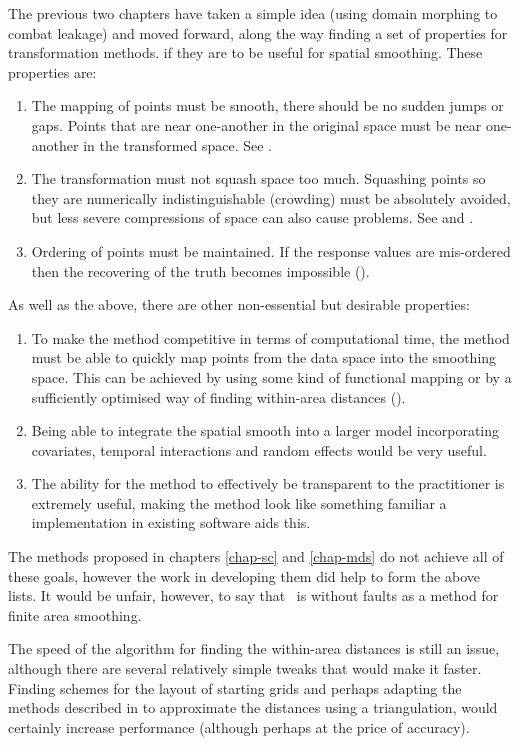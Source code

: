 The previous two chapters have taken a simple idea (using domain morphing to combat leakage) and moved forward, along the way finding a set of properties for transformation methods.
 if they are to be useful for spatial smoothing. These properties are:
\begin{enumerate}
\item The mapping of points must be smooth, there should be no sudden jumps or gaps. Points that are near one-another in the original space must be near one-another in the transformed space. See .
\item The transformation must not squash space too much. Squashing points so they are numerically indistinguishable (crowding) must be absolutely avoided, but less severe compressions of space can also cause problems. See  and .
\item Ordering of points must be maintained. If the response values are mis-ordered then the recovering of the truth becomes impossible ().
\end{enumerate}
As well as the above, there are other non-essential but desirable properties:
\begin{enumerate}
\item To make the method competitive in terms of computational time, the method must be able to quickly map points from the data space into the smoothing space. This can be achieved by using some kind of functional mapping or by a sufficiently optimised way of finding within-area distances ().
\item Being able to integrate the spatial smooth into a larger model incorporating covariates, temporal interactions and random effects would be very useful.
\item The ability for the method to effectively be transparent to the practitioner is extremely useful, making the method look like something familiar a implementation in existing software aids this.
\end{enumerate}

The methods proposed in chapters \ref{chap-sc} and \ref{chap-mds} do not achieve all of these goals, however the work in developing them did help to form the above lists. It would be unfair, however, to say that \mdsds\ is without faults as a method for finite area smoothing.

The speed of the algorithm for finding the within-area distances is still an issue, although there are several relatively simple tweaks that would make it faster. Finding schemes for the layout of starting grids and perhaps adapting the methods described in  to approximate the distances using a triangulation, would certainly increase performance (although perhaps at the price of accuracy).

